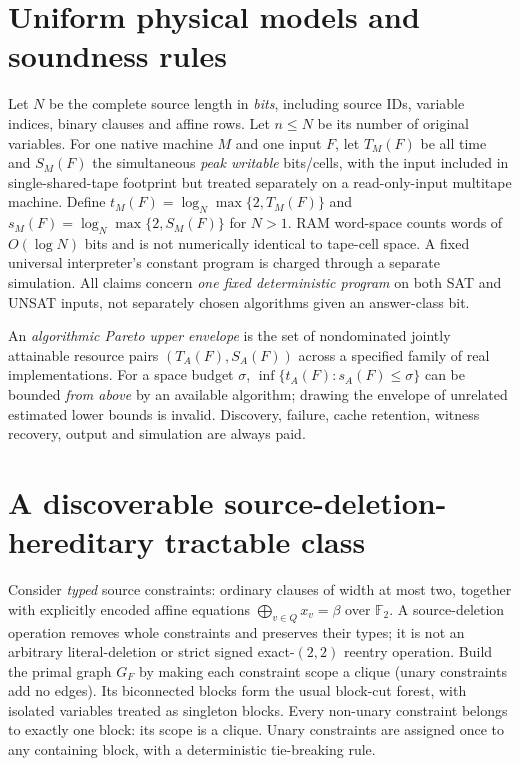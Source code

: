 \documentclass[10pt]{article}
\newcommand{\F}{\mathbb F_2}
\begin{document}
\section{Uniform physical models and soundness rules}
Let $N$ be the complete source length in \emph{bits}, including source IDs, variable indices, binary clauses and affine rows. Let $n\le N$ be its number of original variables. For one native machine $M$ and one input $F$, let $T_M(F)$ be all time and $S_M(F)$ the simultaneous \emph{peak writable} bits/cells, with the input included in single-shared-tape footprint but treated separately on a read-only-input multitape machine. Define $t_M(F)=\log_N\max\{2,T_M(F)\}$ and $s_M(F)=\log_N\max\{2,S_M(F)\}$ for $N>1$. RAM word-space counts words of $O(\log N)$ bits and is not numerically identical to tape-cell space. A fixed universal interpreter's constant program is charged through a separate simulation. All claims concern \emph{one fixed deterministic program} on both SAT and UNSAT inputs, not separately chosen algorithms given an answer-class bit.

An \emph{algorithmic Pareto upper envelope} is the set of nondominated jointly attainable resource pairs $(T_A(F),S_A(F))$ across a specified family of real implementations. For a space budget $\sigma$, $\inf\{t_A(F):s_A(F)\le\sigma\}$ can be bounded \emph{from above} by an available algorithm; drawing the envelope of unrelated estimated lower bounds is invalid. Discovery, failure, cache retention, witness recovery, output and simulation are always paid.

\section{A discoverable source-deletion-hereditary tractable class}
Consider \emph{typed} source constraints: ordinary clauses of width at most two, together with explicitly encoded affine equations $\bigoplus_{v\in Q}x_v=\beta$ over $\F$. A source-deletion operation removes whole constraints and preserves their types; it is not an arbitrary literal-deletion or strict signed exact-$(2,2)$ reentry operation. Build the primal graph $G_F$ by making each constraint scope a clique (unary constraints add no edges). Its biconnected blocks form the usual block-cut forest, with isolated variables treated as singleton blocks. Every non-unary constraint belongs to exactly one block: its scope is a clique. Unary constraints are assigned once to any containing block, with a deterministic tie-breaking rule.
\end{document}
